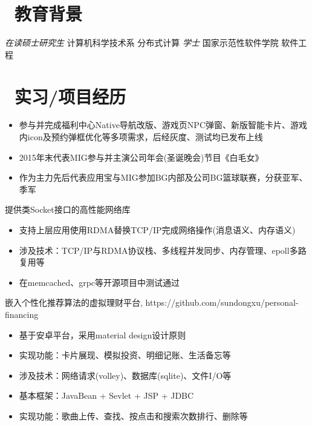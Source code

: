 \documentclass{resume}
\begin{document}
{\section{\faGraduationCap\  教育背景}
\normalsize
\textit{在读硕士研究生} \quad 计算机科学技术系 \quad 分布式计算
\normalsize
\textit{学士} \quad 国家示范性软件学院 \quad 软件工程 

\section{\faUsers\ 实习/项目经历}
\normalsize
{}
\begin{itemize}
  \item 参与并完成福利中心Native导航改版、游戏页NPC弹窗、新版智能卡片、游戏内icon及预约弹框优化等多项需求，后经灰度、测试均已发布上线
  \item 2015年末代表MIG参与并主演公司年会(圣诞晚会)节目《白毛女》
  \item 作为主力先后代表应用宝与MIG参加BG内部及公司BG篮球联赛，分获亚军、季军
\end{itemize}

\normalsize
{}
提供类Socket接口的高性能网络库
\begin{itemize}
  \item 支持上层应用使用RDMA替换TCP/IP完成网络操作(消息语义、内存语义)
  \item 涉及技术：TCP/IP与RDMA协议栈、多线程并发同步、内存管理、epoll多路复用等 
  \item 在memcached、grpc等开源项目中测试通过
\end{itemize}

\normalsize
{}
嵌入个性化推荐算法的虚拟理财平台, https://github.com/sundongxu/personal-financing
\begin{itemize}
  \item 基于安卓平台，采用material design设计原则
  \item 实现功能：卡片展现、模拟投资、明细记账、生活备忘等
  \item 涉及技术：网络请求(volley)、数据库(sqlite)、文件I/O等
\end{itemize}

\normalsize
{}
\begin{itemize}
  \item 基本框架：JavaBean + Sevlet + JSP + JDBC
  \item 实现功能：歌曲上传、查找、按点击和搜索次数排行、删除等
\end{itemize}

}
\end{document}
